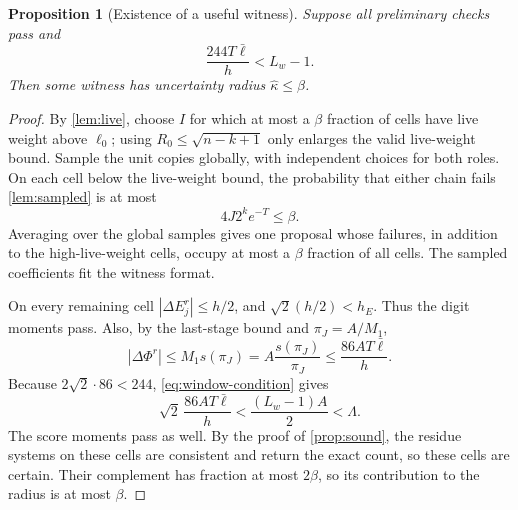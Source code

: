 \documentclass[11pt,letterpaper]{article}
\newtheorem{proposition}[theorem]{Proposition}
\theoremstyle{definition}
\theoremstyle{remark}
\newcommand{\abs}[1]{\left|#1\right|}
\newcommand{\khat}{\widehat\kappa}
\begin{document}
\begin{proposition}[Existence of a useful witness]\label{prop:complete}
Suppose all preliminary checks pass and
\begin{equation}\label{eq:window-condition}
 \frac{244T\bar\ell}{h}<L_w-1.
\end{equation}
Then some witness has uncertainty radius \(\khat\le\beta\).
\end{proposition}
\begin{proof}
By \cref{lem:live}, choose \(I\) for which at most a \(\beta\)
fraction of cells have live weight above \(\ell_0\); using
\(R_0\le\sqrt{n-k+1}\) only enlarges the valid live-weight bound.
Sample the unit copies globally, with independent choices for both
roles. On each cell below the live-weight bound, the probability
that either chain fails \cref{lem:sampled} is at most
\[
 4J2^ke^{-T}\le\beta.
\]
Averaging over the global samples gives one proposal whose failures,
in addition to the high-live-weight cells, occupy at most a
\(\beta\) fraction of all cells. The sampled coefficients fit the
witness format.

On every remaining cell \(\abs{\Delta E_j^r}\le h/2\), and
\(\sqrt2(h/2)<h_E\). Thus the digit moments pass.
Also, by the last-stage bound and \(\pi_J=A/M_1\),
\[
 \abs{\Delta\Phi^r}
 \le M_1s(\pi_J)
 =A\frac{s(\pi_J)}{\pi_J}
 \le\frac{86AT\bar\ell}{h}.
\]
Because \(2\sqrt2\cdot86<244\), \eqref{eq:window-condition} gives
\[
 \sqrt2\,\frac{86AT\bar\ell}{h}
 <\frac{(L_w-1)A}{2}<\Lambda.
\]
The score moments pass as well. By the proof of \cref{prop:sound},
the residue systems on these cells are consistent and return the
exact count, so these cells are certain. Their complement has fraction at most
\(2\beta\), so its contribution to the radius is at most
\(\beta\).
\end{proof}
\end{document}
